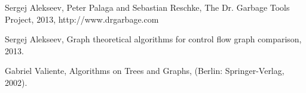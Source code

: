 
\label{cha:references} 

\begin{thebibliography}{1}

  Sergej Alekseev, Peter Palaga and Sebastian Reschke, The Dr. Garbage Tools Project, 2013,
http://www.drgarbage.com

  Sergej Alekseev, Graph theoretical algorithms for control flow graph comparison, 2013.
 
 
 Gabriel Valiente, Algorithms on Trees and Graphs,
(Berlin: Springer-Verlag, 2002).

 \end{thebibliography}
  